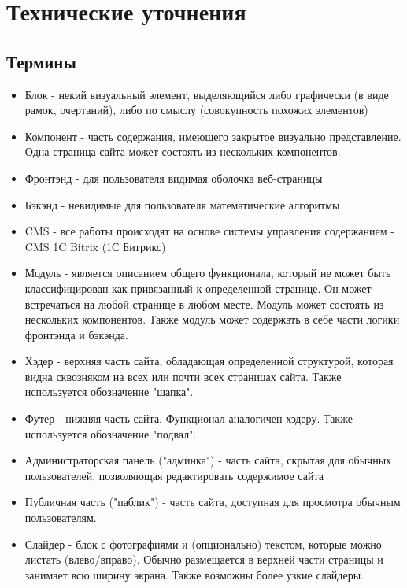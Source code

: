 \documentclass[DIV=calc, paper=a4, fontsize=11pt]{scrartcl} %
\begin{document}
\section{Технические уточнения}

\subsection{Термины}

        \begin{itemize}
        \item Блок - некий визуальный элемент, выделяющийся либо графически (в виде рамок, очертаний), либо по смыслу (совокупность похожих элементов)
        \item Компонент - часть содержания, имеющего закрытое визуально представление. Одна страница сайта может состоять из нескольких компонентов.
        \item Фронтэнд - для пользователя видимая оболочка веб-страницы
        \item Бэкэнд - невидимые для пользователя математические алгоритмы
        \item CMS - все работы происходят на основе системы управления содержанием - CMS 1C Bitrix (1С Битрикс)
        \item Модуль - является описанием общего функционала, который не может быть классифицирован как привязанный к определенной странице. Он может встречаться на любой странице в любом месте. Модуль может состоять из нескольких компонентов. Также модуль может содержать в себе части логики фронтэнда и бэкэнда.
        \item Хэдер - верхняя часть сайта, обладающая определенной структурой, которая видна сквозняком на всех или почти всех страницах сайта. Также используется обозначение "шапка".
        \item Футер - нижняя часть сайта. Функционал аналогичен хэдеру. Также используется обозначение "подвал".
        \item Администраторская панель ("админка") - часть сайта, скрытая для обычных пользователей, позволяющая редактировать содержимое сайта
        \item Публичная часть ("паблик") - часть сайта, доступная для просмотра обычным пользователям.
        \item Слайдер - блок с фотографиями и (опционально) текстом, которые можно листать (влево/вправо). Обычно размещается в верхней части страницы и занимает всю ширину экрана. Также возможны более узкие слайдеры.

    \end{itemize}
    
\end{document}

